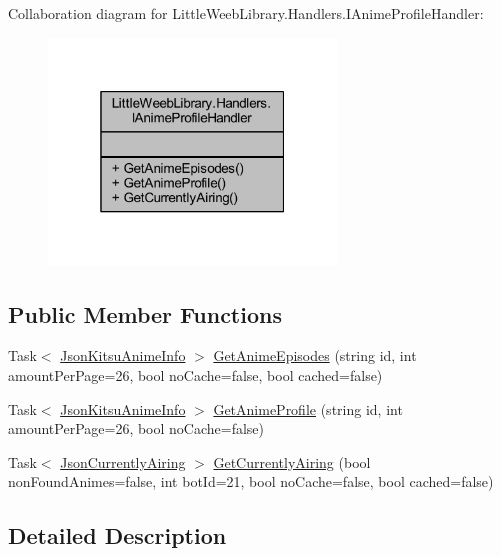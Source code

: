 Collaboration diagram for Little\+Weeb\+Library.\+Handlers.\+I\+Anime\+Profile\+Handler\+:\nopagebreak
\begin{figure}[H]
\begin{center}
\leavevmode
\includegraphics[width=217pt]{interface_little_weeb_library_1_1_handlers_1_1_i_anime_profile_handler__coll__graph}
\end{center}
\end{figure}
\subsection*{Public Member Functions}
\begin{DoxyCompactItemize}
\item 
Task$<$ \mbox{\hyperlink{class_little_weeb_library_1_1_models_1_1_json_kitsu_anime_info}{Json\+Kitsu\+Anime\+Info}} $>$ \mbox{\hyperlink{interface_little_weeb_library_1_1_handlers_1_1_i_anime_profile_handler_ac23c001a51abb10a3d013738000dafec}{Get\+Anime\+Episodes}} (string id, int amount\+Per\+Page=26, bool no\+Cache=false, bool cached=false)
\item 
Task$<$ \mbox{\hyperlink{class_little_weeb_library_1_1_models_1_1_json_kitsu_anime_info}{Json\+Kitsu\+Anime\+Info}} $>$ \mbox{\hyperlink{interface_little_weeb_library_1_1_handlers_1_1_i_anime_profile_handler_ad0fbcf84372d9d564e8d84d3291fa136}{Get\+Anime\+Profile}} (string id, int amount\+Per\+Page=26, bool no\+Cache=false)
\item 
Task$<$ \mbox{\hyperlink{class_little_weeb_library_1_1_models_1_1_json_currently_airing}{Json\+Currently\+Airing}} $>$ \mbox{\hyperlink{interface_little_weeb_library_1_1_handlers_1_1_i_anime_profile_handler_ad59273ddfe35a2560f3e07879b334c25}{Get\+Currently\+Airing}} (bool non\+Found\+Animes=false, int bot\+Id=21, bool no\+Cache=false, bool cached=false)
\end{DoxyCompactItemize}


\subsection{Detailed Description}


